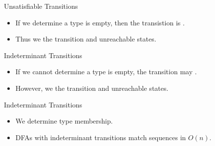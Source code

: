 \begin{frame}{Unsatisfiable Transitions}

  \scalebox{0.8}{}
  \begin{itemize}
  \item   If we determine a type is empty, then the transistion is .
  \item Thus we  the transition and unreachable states.

  \end{itemize}
\end{frame}

\begin{frame}{Indeterminant Transitions}

  \scalebox{0.8}{}

  \begin{itemize}
  \item   If we cannot determine a type is empty, the transition may
    . 
  \item  However, we     the transition and unreachable states.
  \end{itemize}
\end{frame}


\begin{frame}{Indeterminant Transitions}

  \scalebox{0.8}{}

  \begin{itemize}
    \item We  determine type membership.
    \item DFAs with indeterminant transitions 
      match sequences in $O(n)$.
  \end{itemize}
\end{frame}


